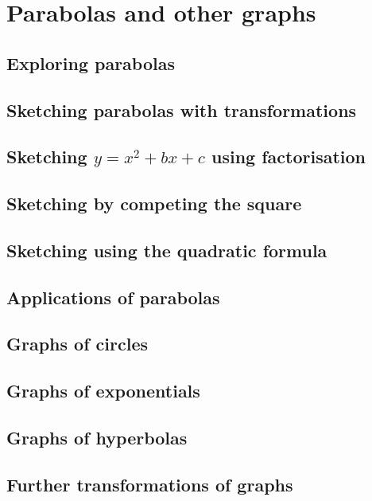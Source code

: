 \section{Parabolas and other graphs}
\begin{outline}

\0
\subsection{Exploring parabolas}

\0
\subsection{Sketching parabolas with transformations}

\0
\subsection{Sketching $y = x^2 + bx + c$ using factorisation}

\0
\subsection{Sketching by competing the square}

\0
\subsection{Sketching using the quadratic formula}

\0
\subsection{Applications of parabolas}

\0
\subsection{Graphs of circles}

\0
\subsection{Graphs of exponentials}

\0
\subsection{Graphs of hyperbolas}

\0
\subsection{Further transformations of graphs}

\end{outline}
